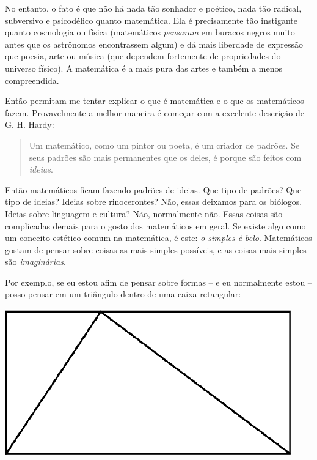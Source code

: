 \documentclass[a4paper,oneside,10pt,notitlepage]{article}
\begin{document}
No entanto, o fato é que não há nada tão sonhador e poético, nada tão radical, subversivo e psicodélico quanto matemática.
Ela é precisamente tão instigante quanto cosmologia ou física (matemáticos \textsl{pensaram} em buracos negros muito antes que os astrônomos encontrassem algum) e dá mais liberdade de expressão que poesia, arte ou música (que dependem fortemente de propriedades do universo físico).
A matemática é a mais pura das artes e também a menos compreendida.

Então permitam-me tentar explicar o que é matemática e o que os matemáticos fazem.
Provavelmente a melhor maneira é começar com a excelente descrição de G. H. Hardy:

\begin{quote}
Um matemático, como um pintor ou poeta, é um criador de padrões.
Se seus padrões são mais permanentes que os deles, é porque são feitos com \textsl{ideias}.
\end{quote}

Então matemáticos ficam fazendo padrões de ideias.
Que tipo de padrões? Que tipo de ideias?
Ideias sobre rinocerontes? Não, essas deixamos para os biólogos.
Ideias sobre linguagem e cultura? Não, normalmente não.
Essas coisas são complicadas demais para o gosto dos matemáticos em geral.
Se existe algo como um conceito estético comum na matemática, é este: \textsl{o simples é belo}.
Matemáticos gostam de pensar sobre coisas as mais simples possíveis, e as coisas mais simples são \textsl{imaginárias}.

Por exemplo, se eu estou afim de pensar sobre formas -- e eu normalmente estou -- posso pensar em um triângulo dentro de uma caixa retangular:

\begin{center}
\includegraphics{triangle0.eps}
\end{center}
\end{document}
